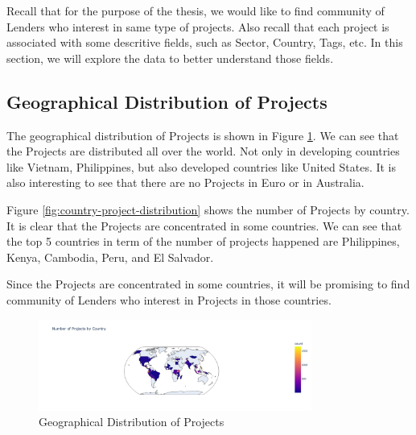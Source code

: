 Recall that for the purpose of the thesis, we would like to find community of Lenders who interest in same type of projects.
Also recall that each project is associated with some descritive fields, such as Sector, Country, Tags, etc.
In this section, we will explore the data to better understand those fields.

\subsection{Geographical Distribution of Projects}

The geographical distribution of Projects is shown in Figure \ref{fig:map-number-project-by-country}.
We can see that the Projects are distributed all over the world.
Not only in developing countries like Vietnam, Philippines,
but also developed countries like United States.
It is also interesting to see that there are no Projects in Euro or in Australia.

Figure \ref{fig:country-project-distribution} shows the number of Projects by country.
It is clear that the Projects are concentrated in some countries.
We can see that the top 5 countries in term of the number of projects happened are Philippines, Kenya, Cambodia, Peru, and El Salvador.

Since the Projects are concentrated in some countries,
it will be promising to find community of Lenders who interest in Projects in those countries.

\begin{figure}[H]
	\centering
	\includegraphics[width=0.8\textwidth]{images/map-number-project-by-country.png}
	\caption{Geographical Distribution of Projects}
	\label{fig:map-number-project-by-country}
\end{figure}


